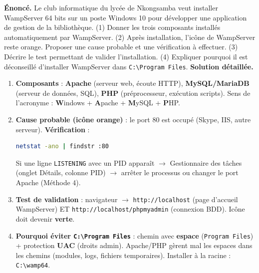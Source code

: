 \documentclass[11pt]{article}
\begin{document}
\begin{exoresolu}
\textbf{Énoncé.} Le club informatique du lycée de Nkongsamba veut installer WampServer 64 bits sur un poste Windows 10 pour développer une application de gestion de la bibliothèque. (1) Donner les trois composants installés automatiquement par WampServer. (2) Après installation, l'icône de WampServer reste orange. Proposer une cause probable et une vérification à effectuer. (3) Décrire le test permettant de valider l'installation. (4) Expliquer pourquoi il est déconseillé d'installer WampServer dans \texttt{C:\textbackslash Program Files}.
\tcblower
\textbf{Solution détaillée.}
\begin{enumerate}
\item \textbf{Composants} : \textbf{Apache} (serveur web, écoute HTTP), \textbf{MySQL/MariaDB} (serveur de données, SQL), \textbf{PHP} (préprocesseur, exécution scripts). Sens de l'acronyme : \textbf{W}indows + \textbf{A}pache + \textbf{M}ySQL + \textbf{P}HP.
\item \textbf{Cause probable (icône orange)} : le port 80 est occupé (Skype, IIS, autre serveur). \textbf{Vérification} :
\begin{lstlisting}[language=bash]
netstat -ano | findstr :80
\end{lstlisting}
Si une ligne \texttt{LISTENING} avec un PID apparaît $\rightarrow$ Gestionnaire des tâches (onglet Détails, colonne PID) $\rightarrow$ arrêter le processus ou changer le port Apache (Méthode 4).
\item \textbf{Test de validation} : navigateur $\rightarrow$ \texttt{http://localhost} (page d'accueil WampServer) ET \texttt{http://localhost/phpmyadmin} (connexion BDD). Icône doit devenir \textbf{verte}.
\item \textbf{Pourquoi éviter \texttt{C:\textbackslash Program Files}} : chemin avec \textbf{espace} (\texttt{Program Files}) + protection \textbf{UAC} (droits admin). Apache/PHP gèrent mal les espaces dans les chemins (modules, logs, fichiers temporaires). Installer à la racine : \texttt{C:\textbackslash wamp64}.
\end{enumerate}
\end{exoresolu}
\end{document}
